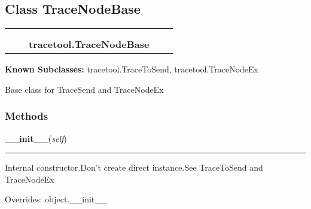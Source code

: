 
\subsection{Class TraceNodeBase}

    \label{tracetool:TraceNodeBase}
\begin{tabular}{cccccc}
\multicolumn{2}{r}{\settowidth{\BCL}{object}\multirow{2}{\BCL}{object}}
&&
  \\\cline{3-3}
  &&\multicolumn{1}{c|}{}
&&
  \\
&&\multicolumn{2}{l}{\textbf{tracetool.TraceNodeBase}}
\end{tabular}

\textbf{Known Subclasses:}
tracetool.TraceToSend,
    tracetool.TraceNodeEx

Base class for TraceSend and TraceNodeEx



  \subsubsection{Methods}

    \vspace{0.5ex}

\hspace{.8\funcindent}\begin{boxedminipage}{\funcwidth}

    \raggedright \textbf{\_\_init\_\_}(\textit{self})

    \vspace{-1.5ex}

    \rule{\textwidth}{0.5\fboxrule}
\setlength{\parskip}{2ex}
    Internal constructor.Don't create direct instance.See TraceToSend and 
    TraceNodeEx

\setlength{\parskip}{1ex}
      Overrides: object.\_\_init\_\_

    \end{boxedminipage}


